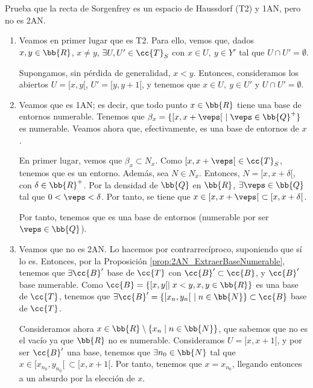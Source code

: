 \begin{ejercicio}
    Prueba que la recta de Sorgenfrey es un espacio de Haussdorf (T2) y 1AN, pero no es 2AN.

    \begin{enumerate}
        \item Veamos en primer lugar que es T2. Para ello, vemos que, dados $x,y\in \bb{R}$, $x\neq y$, $\exists U,U'\in \cc{T}_S$ con $x\in U,~ y\in Y'$ tal que $U\cap U'=\emptyset$.
    
        Supongamos, sin pérdida de generalidad, $x<y$. Entonces, consideramos los abiertos $U=[x,y[$, $U'=[y,y+1[$, y tenemos que $x\in U,~y\in U'$ y $U\cap U'=\emptyset$.
    
        \item Veamos que es 1AN; es decir, que todo punto $x\in \bb{R}$ tiene una base de entornos numerable. Tenemos que $\beta_x=\{[x, x+\veps[~ \mid \veps\in \bb{Q}^+\}$ es numerable. Veamos ahora que, efectivamente, es una base de entornos de $x$.

        En primer lugar, vemos que $\beta_x\subset N_x$. Como $[x,x+\veps[~ \in\cc{T}_S$, tenemos que es un entorno. Además, sea $N\in N_x$. Entonces, $N=[x,x+\delta[$, con $\delta\in \bb{R}^+$. Por la densidad de $\bb{Q}$ en $\bb{R}$, $\exists \veps\in \bb{Q}$ tal que $0<\veps<\delta$. Por tanto, se tiene que $x\in [x,x+\veps[~ \subset [x,x+\delta[$.
        
        Por tanto, tenemos que es una base de entornos (numerable por ser $\veps\in\bb{Q}$).

        \item Veamos que no es 2AN. Lo hacemos por contrarrecíproco, suponiendo que sí lo es. Entonces, por la Proposición \ref{prop:2AN_ExtraerBaseNumerable}, tenemos que $\exists \cc{B}'$ base de $\cc{T}$ con $\cc{B}'\subset \cc{B}$, y $\cc{B}'$ base numerable. Como $\cc{B}=\{[x,y[\mid x<y, x,y\in \bb{R}\}$ es una base de $\cc{T}$, tenemos que $\exists \cc{B}'=\{[x_n,y_n[~ \mid n\in \bb{N}\}\subset \cc{B}$ base de $\cc{T}$. 
        
        Consideramos ahora $x\in \bb{R}\setminus \{x_n\mid n\in \bb{N}\}$, que sabemos que no es el vacío ya que $\bb{R}$ no es numerable. Consideramos $U=[x,x+1[$, y por ser $\cc{B}'$ una base, tenemos que $\exists n_0\in \bb{N}$ tal que $x\in [x_{n_0},y_{n_0}[~ \subset [x,x+1[$. Por tanto, tenemos que $x=x_{n_0}$, llegando entonces a un absurdo por la elección de $x$.
    \end{enumerate}
\end{ejercicio}

